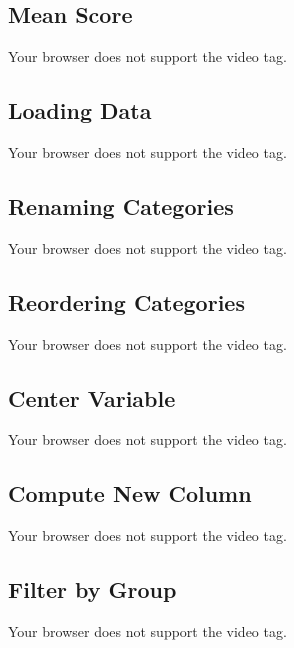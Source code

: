 \documentclass[
  letterpaper,
  DIV=11,
  numbers=noendperiod]{scrreprt}
\begin{document}
\hypertarget{mean-score}{%
\subsection{Mean Score}\label{mean-score}}

Your browser does not support the video tag.

\hypertarget{loading-data}{%
\subsection{Loading Data}\label{loading-data}}

Your browser does not support the video tag.

\hypertarget{renaming-categories}{%
\subsection{Renaming Categories}\label{renaming-categories}}

Your browser does not support the video tag.

\hypertarget{reordering-categories}{%
\subsection{Reordering Categories}\label{reordering-categories}}

Your browser does not support the video tag.

\hypertarget{center-variable}{%
\subsection{Center Variable}\label{center-variable}}

Your browser does not support the video tag.

\hypertarget{compute-new-column}{%
\subsection{Compute New Column}\label{compute-new-column}}

Your browser does not support the video tag.

\hypertarget{filter-by-group}{%
\subsection{Filter by Group}\label{filter-by-group}}

Your browser does not support the video tag.
\end{document}
